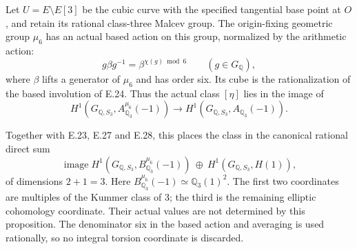 \begin{proposition}
\label{E-mu6-three-parameters}
Let $U=E\setminus E[3]$ be the cubic curve with the
specified tangential base point at $O$, and retain its
rational class-three Malcev group. The origin-fixing
geometric group $\mu_6$ has an actual based action on
this group, normalized by the arithmetic action:
\[
       g\beta g^{-1}=\beta^{\chi(g)\bmod6}
       \qquad(g\in G_{\mathbb Q}),
 \tag{E.29.1}
\]
where $\beta$ lifts a generator of $\mu_6$ and has
order six. Its cube is the rationalization of the
based involution of E.24. Thus the actual class
$[\eta]$ lies in the image of
\[
 H^1(G_{\mathbb Q,S_3},A_{\mathbb Q_3}^{\mu_6}(-1))
       \longrightarrow
 H^1(G_{\mathbb Q,S_3},A_{\mathbb Q_3}(-1)).
 \tag{E.29.2}
\]

Together with E.23, E.27 and E.28, this places the
class in the canonical rational direct sum
\[
 \operatorname{image}
 H^1(G_{\mathbb Q,S_3},B_{\mathbb Q_3}^{\mu_6}(-1))
 \ \oplus\
 H^1(G_{\mathbb Q,S_3},H(1)),
 \tag{E.29.3}
\]
of dimensions $2+1=3$. Here
$B_{\mathbb Q_3}^{\mu_6}(-1)\simeq\mathbb Q_3(1)^2$.
The first two coordinates are multiples of the
Kummer class of $3$; the third is the remaining
elliptic cohomology coordinate. Their actual values
are not determined by this proposition. The
denominator six in the based action and averaging
is used rationally, so no integral torsion coordinate
is discarded.
\end{proposition}
